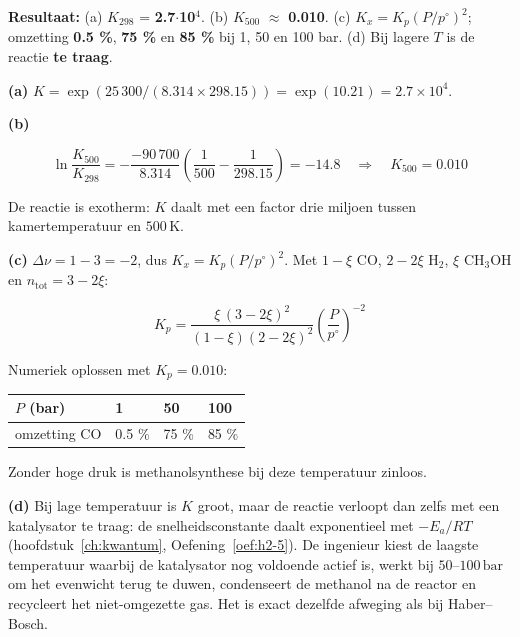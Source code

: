 \begin{oplossing}
\textbf{Resultaat:} (a) \(K_{298}\) = \textbf{2.7\ensuremath{\cdot{}}10\ensuremath{^{4}}}. (b) \(K_{500}\) \ensuremath{\approx{}} \textbf{0.010}. (c) \(K_x = K_p(P/p^\circ)^2\); omzetting \textbf{0.5 \%}, \textbf{75 \%} en \textbf{85 \%} bij 1, 50 en 100 bar. (d) Bij lagere \(T\) is de reactie \textbf{te traag}.

\textbf{(a)} \(K = \exp(25\,300/(8.314 \times 298.15)) = \exp(10.21) = 2.7\times10^{4}\).

\textbf{(b)}

\[
\ln\frac{K_{500}}{K_{298}} = -\frac{-90\,700}{8.314}\left(\frac{1}{500} - \frac{1}{298.15}\right) = -14.8 \quad\Rightarrow\quad K_{500} = 0.010
\]

De reactie is exotherm: \(K\) daalt met een factor drie miljoen tussen kamertemperatuur en \(500\,\mathrm{K}\).

\textbf{(c)} \(\Delta\nu = 1 - 3 = -2\), dus \(K_x = K_p (P/p^\circ)^2\). Met \(1-\xi\) CO, \(2-2\xi\) \(\mathrm{H_2}\), \(\xi\) \(\mathrm{CH_3OH}\) en \(n_{\text{tot}} = 3 - 2\xi\):

\[
K_p = \frac{\xi\,(3-2\xi)^2}{(1-\xi)(2-2\xi)^2}\left(\frac{P}{p^\circ}\right)^{-2}
\]

Numeriek oplossen met \(K_p = 0.010\):

\begin{center}
\begin{tabular}{llll}
\toprule
\(P\) (bar) & 1 & 50 & 100 \\
\midrule
omzetting CO & 0.5 \% & 75 \% & 85 \% \\
\bottomrule
\end{tabular}
\end{center}

Zonder hoge druk is methanolsynthese bij deze temperatuur zinloos.

\textbf{(d)} Bij lage temperatuur is \(K\) groot, maar de reactie verloopt dan zelfs met een katalysator te traag: de snelheidsconstante daalt exponentieel met \(-E_a/RT\) (hoofdstuk~\ref{ch:kwantum}, Oefening~\ref{oef:h2-5}). De ingenieur kiest de laagste temperatuur waarbij de katalysator nog voldoende actief is, werkt bij \(50\)--\(100\,\mathrm{bar}\) om het evenwicht terug te duwen, condenseert de methanol na de reactor en recycleert het niet-omgezette gas. Het is exact dezelfde afweging als bij Haber--Bosch.
\end{oplossing}

